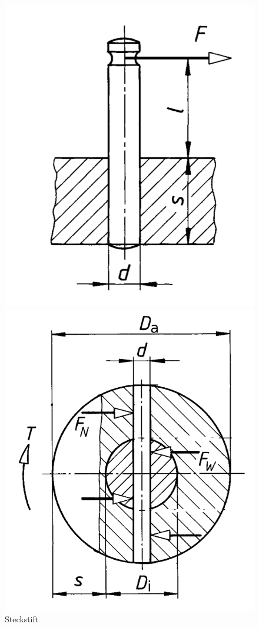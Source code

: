 \begin{figure}[H]
\begin{minipage}[b]{0.22\linewidth}
		\includegraphics[width=\linewidth]{bolzen-und-stiftverbindungen/steckstift}
		\caption*{Steckstift}
	\end{minipage}
	\begin{minipage}[b]{0.22\linewidth}
		\includegraphics[width=\linewidth]{bolzen-und-stiftverbindungen/querstift}

\end{minipage}
\end{figure}

